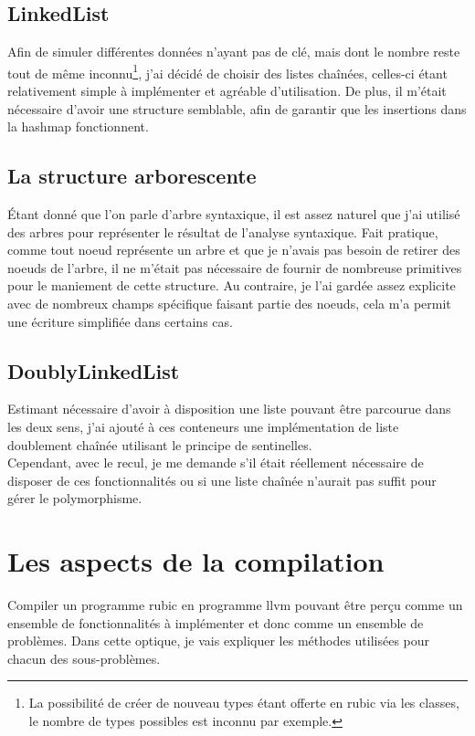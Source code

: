 \documentclass[12pt]{article}
\begin{document}
\subsection{LinkedList}
Afin de simuler différentes données n'ayant pas de clé, mais dont le nombre
reste tout de même inconnu\footnote{La possibilité de créer de nouveau types
étant offerte en rubic via les classes, le nombre de types possibles est
inconnu par exemple.}, j'ai décidé de choisir des listes chaînées, celles-ci
étant relativement simple à implémenter et agréable d'utilisation. De plus,
il m'était nécessaire d'avoir une structure semblable, afin de garantir que
les insertions dans la hashmap fonctionnent.

\subsection{La structure arborescente}
Étant donné que l'on parle d'arbre syntaxique, il est assez naturel que j'ai
utilisé des arbres pour représenter le résultat de l'analyse syntaxique. Fait
pratique, comme tout noeud représente un arbre et que je n'avais pas besoin
de retirer des noeuds de l'arbre, il ne m'était pas nécessaire de fournir
de nombreuse primitives pour le maniement de cette structure. Au contraire,
je l'ai gardée assez explicite avec de nombreux champs spécifique faisant
partie des noeuds, cela m'a permit une écriture simplifiée dans certains cas.

\subsection{DoublyLinkedList}
Estimant nécessaire d'avoir à disposition une liste pouvant être parcourue
dans les deux sens, j'ai ajouté à ces conteneurs une implémentation de liste
doublement chaînée utilisant le principe de sentinelles.\\

Cependant, avec le recul, je me demande s'il était réellement nécessaire de
disposer de ces fonctionnalités ou si une liste chaînée n'aurait pas suffit
pour gérer le polymorphisme.

\section{Les aspects de la compilation}
Compiler un programme rubic en programme llvm pouvant être perçu comme un
ensemble de fonctionnalités à implémenter et donc comme un ensemble de
problèmes. Dans cette optique, je vais expliquer les méthodes utilisées pour
chacun des sous-problèmes.\\
\end{document}
